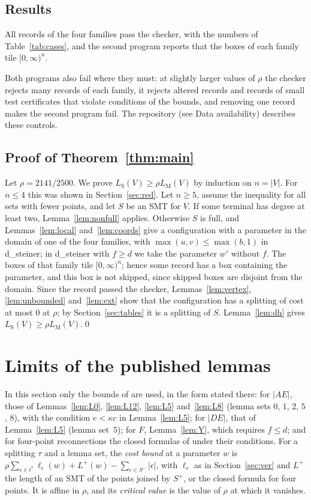 \documentclass[11pt]{amsart}
\theoremstyle{definition}
\theoremstyle{remark}
\numberwithin{equation}{section}
\newcommand{\LS}{L_{\mathrm S}}
\newcommand{\LM}{L_{\mathrm M}}
\begin{document}
\subsection{Results}
All records of the four families pass the checker, with the numbers of Table~\ref{tab:cases}, and the second program reports that the boxes of each family tile $[0,\infty)^n$.

Both programs also fail where they must: at slightly larger values of $\rho$ the checker rejects many records of each family, it rejects altered records and records of small test certificates that violate conditions of the bounds, and removing one record makes the second program fail. The repository (see Data availability) describes these controls.

\subsection{Proof of Theorem~\ref{thm:main}}
Let $\rho=2141/2500$. We prove $\LS(V)\ge\rho\LM(V)$ by induction on $n=|V|$. For $n\le4$ this was shown in Section~\ref{sec:red}. Let $n\ge5$, assume the inequality for all sets with fewer points, and let $S$ be an SMT for $V$. If some terminal has degree at least two, Lemma~\ref{lem:nonfull} applies. Otherwise $S$ is full, and Lemmas~\ref{lem:local} and~\ref{lem:coords} give a configuration with a parameter in the domain of one of the four families, with $\max(u,v)\le\max(b,1)$ in d\_steiner; in d\_steiner with $f\ge d$ we take the parameter $w'$ without $f$. The boxes of that family tile $[0,\infty)^n$; hence some record has a box containing the parameter, and this box is not skipped, since skipped boxes are disjoint from the domain. Since the record passed the checker, Lemmas~\ref{lem:vertex}, \ref{lem:unbounded} and~\ref{lem:ext} show that the configuration has a splitting of cost at most $0$ at $\rho$; by Section~\ref{sec:tables} it is a splitting of $S$. Lemma~\ref{lem:dh} gives $\LS(V)\ge\rho\LM(V)$.\qed

\section{Limits of the published lemmas}\label{sec:cap}

In this section only the bounds of \cite{KHSHGW} are used, in the form stated there: for $|AE|$, those of Lemmas~\ref{lem:L0}, \ref{lem:L12}, \ref{lem:L5} and~\ref{lem:L8} (lemma sets $0$, $1$, $2$, $5$, $8$), with the condition $e<\kappa c$ in Lemma~\ref{lem:L5}; for $|DE|$, that of Lemma~\ref{lem:L5} (lemma set~$5$); for $F$, Lemma~\ref{lem:Y}, which requires $f\le d$; and for four-point reconnections the closed formulas of \cite{KHSHGW} under their conditions. For a splitting $\tau$ and a lemma set, the \emph{cost bound} at a parameter $w$ is $\rho\sum_{\epsilon\in t^*}\ell_\epsilon(w)+L^+(w)-\sum_{\epsilon\in S^-}|\epsilon|$, with $\ell_\epsilon$ as in Section~\ref{sec:ver} and $L^+$ the length of an SMT of the points joined by $S^+$, or the closed formula for four points. It is affine in $\rho$, and its \emph{critical value} is the value of $\rho$ at which it vanishes.
\end{document}
